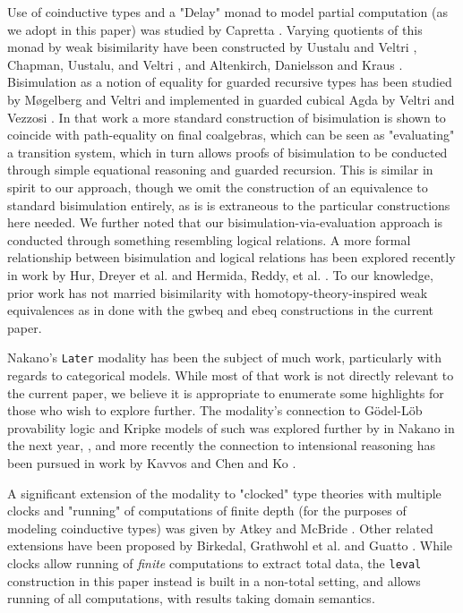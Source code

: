 \documentclass[sigplan,screen]{acmart}
\newcommand{\hs}{\texttt}
\begin{document}
Use of coinductive types and a "Delay" monad to model partial computation (as we adopt in this paper) was studied by Capretta \cite{capretta2005general}. Varying quotients of this monad by weak bisimilarity have been constructed by Uustalu and Veltri \cite{uustalu2017delay}, Chapman, Uustalu, and Veltri \cite{chapman2019quotienting}, and Altenkirch, Danielsson and Kraus \cite{altenkirch2017partiality}. Bisimulation as a notion of equality for guarded recursive types has been studied by Møgelberg and Veltri \cite{mogelberg-veltri:2019} and implemented in guarded cubical Agda by Veltri and Vezzosi \cite{veltri-vezzosi:2020}. In that work a more standard construction of bisimulation is shown to coincide with path-equality on final coalgebras, which can be seen as "evaluating" a transition system, which in turn allows proofs of bisimulation to be conducted through simple equational reasoning and guarded recursion. This is similar in spirit to our approach, though we omit the construction of an equivalence to standard bisimulation entirely, as is is extraneous to the particular constructions here needed. We further noted that our bisimulation-via-evaluation approach is conducted through something resembling logical relations. A more formal relationship between bisimulation and logical relations has been explored recently in work by Hur, Dreyer et al. \cite{hur2012marriage} and Hermida, Reddy, et al. \cite{hermida_reddy_robinson_santamaria_2022}. To our knowledge, prior work has not married bisimilarity with homotopy-theory-inspired weak equivalences as in done with the gwbeq and ebeq constructions in the current paper.

Nakano's \hs{Later} modality \cite{nakano2000modality} has been the subject of much work, particularly with regards to categorical models. While most of that work is not directly relevant to the current paper, we believe it is appropriate to enumerate some highlights for those who wish to explore further. The modality's connection to Gödel-Löb provability logic and Kripke models of such was explored further by in Nakano in the next year, \cite{nakano2001fixed}, and more recently the connection to intensional reasoning has been pursued in work by Kavvos \cite{kavvos2017intensionality, kavvos2017semantics} and Chen and Ko \cite{chen-ko:2022}.

A significant extension of the modality to "clocked" type theories with multiple clocks and "running" of computations of finite depth (for the purposes of modeling coinductive types) was given by Atkey and McBride \cite{atkey2013productive}. Other related extensions have been proposed by Birkedal, Grathwohl et al. \cite{birkedal2017guarded} and Guatto \cite{guatto:2018}. While clocks allow running of \emph{finite} computations to extract total data, the \hs{leval} construction in this paper instead is built in a non-total setting, and allows running of all computations, with results taking domain semantics.
\end{document}
